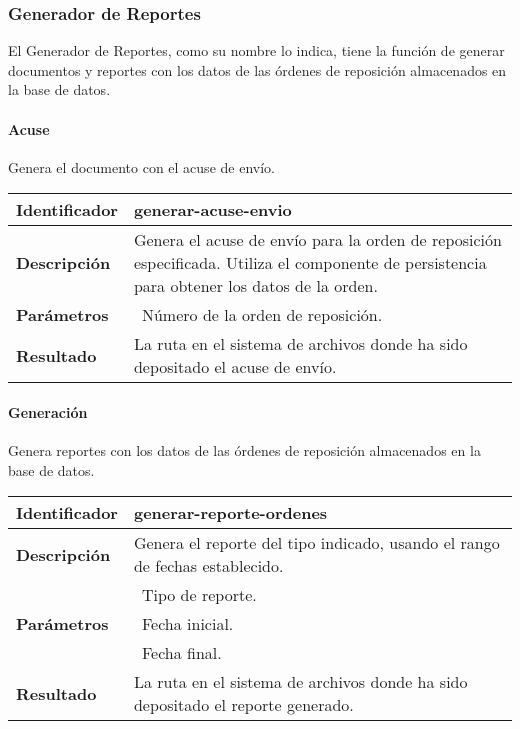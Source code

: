 \subsubsection{Generador de Reportes}
El Generador de Reportes, como su nombre lo indica, tiene la función de generar documentos y reportes con los datos de las órdenes de reposición almacenados en la base de datos. 
\paragraph{Acuse\\} Genera el documento con el acuse de envío.
	\vspace{5mm}\\
	\begin{tabular}{|p{}|p{}|}
		\hline
		\textbf{Identificador}	& \textbf{generar-acuse-envio}\\
		\hline
		\hline
		\textbf{Descripción}	& Genera el acuse de envío para la orden de reposición especificada. Utiliza el componente de persistencia para obtener los datos de la orden.\\
		\hline
		\textbf{Parámetros}		& \textbullet\, Número de la orden de reposición.\\
		\hline
		\textbf{Resultado}		& La ruta en el sistema de archivos donde ha sido depositado el acuse de envío.\\
		\hline
	\end{tabular}
	\vspace{5mm}

\paragraph{Generación\\} Genera reportes con los datos de las órdenes de reposición almacenados en la base de datos.
	\vspace{5mm}\\
	\begin{tabular}{|p{}|p{}|}
		\hline
		\textbf{Identificador}	& \textbf{generar-reporte-ordenes}\\
		\hline
		\hline
		\textbf{Descripción}	& Genera el reporte del tipo indicado, usando el rango de fechas establecido.\\
		\hline
		\multirow{3}{*}{\textbf{Parámetros}}	& \textbullet\, Tipo de reporte.\\
												& \textbullet\, Fecha inicial.\\
												& \textbullet\, Fecha final.\\
		\hline
		\textbf{Resultado}		& La ruta en el sistema de archivos donde ha sido depositado el reporte generado.\\
		\hline
	\end{tabular}
	\vspace{5mm}

